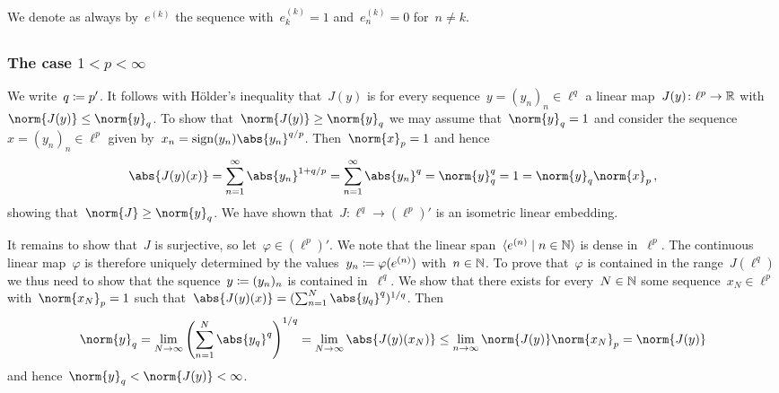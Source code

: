 \section{}

We denote as always by~$e^{(k)}$ the sequence with~$e^{(k)}_k = 1$ and~$e^{(k)}_n = 0$ for~$n \neq k$.





\subsection{}



\subsubsection{The case $1 < p < \infty$}

We write~$q \coloneqq p'$.
It follows with Hölder’s inequality that~$J(y)$ is for every sequence~$y = (y_n)_n \in \ell^q$ a {\welldef} linear map~$J(y) \colon \ell^p \to \mathbb{R}$ with~$\norm{J(y)} \leq \norm{y}_q$.
To show that~$\norm{J(y)} \geq \norm{y}_q$ we may assume that~$\norm{y}_q = 1$ and consider the sequence~$x = (y_n)_n \in \ell^p$ given by~$x_n = \sign(y_n) \abs{y_n}^{q/p}$.
Then~$\norm{x}_p = 1$ and hence
\[
    \abs{J(y)(x)}
  = \sum_{n=1}^\infty \abs{y_n}^{1 + q/p}
  = \sum_{n=1}^\infty \abs{y_n}^q
  = \norm{y}_q^q
  = 1
  = \norm{y}_q \norm{x}_p \,,
\]
showing that~$\norm{J} \geq \norm{y}_q$.
We have shown that~$J \colon \ell^q \to (\ell^p)'$ is an isometric linear embedding.

It remains to show that~$J$ is surjective, so let~$\varphi \in (\ell^p)'$.
We note that the linear span~$\gen{e^{(n)} \suchthat n \in \Natural}$ is dense in~$\ell^p$.
The continuous linear map~$\varphi$ is therefore uniquely determined by the values~$y_n \coloneqq \varphi(e^{(n)})$ with~$n \in \mathbb{N}$.
To prove that~$\varphi$ is contained in the range~$J(\ell^q)$ we thus need to show that the squence~$y \coloneqq (y_n)_n$ is contained in~$\ell^q$.
We show that there exists for every~$N \in \mathbb{N}$ some sequence~$x_N \in \ell^p$ with~$\norm{x_N}_p = 1$ such that~$\abs{J(y)(x)} = (\sum_{n=1}^N \abs{y_q}^q)^{1/q}$.
Then
\[
        \norm{y}_q
  =     \lim_{N \to \infty} \left( \sum_{n=1}^N \abs{y_q}^q \right)^{1/q}
  =     \lim_{N \to \infty} \abs{J(y)(x_N)}
  \leq  \lim_{n \to \infty} \norm{J(y)} \norm{x_N}_p
  =     \norm{J(y)}
\]
and hence~$\norm{y}_q < \norm{J(y)} < \infty$.

